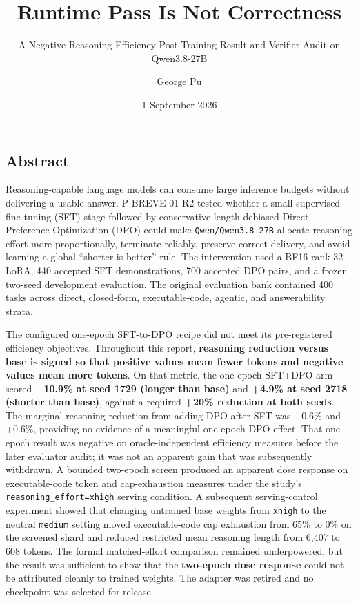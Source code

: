 \documentclass[
  9pt,
  letterpaper,
]{article}
\title{Runtime Pass Is Not Correctness}
\subtitle{A Negative Reasoning-Efficiency Post-Training Result and
Verifier Audit on Qwen3.8-27B}
\author{George Pu}
\date{1 September 2026}
\begin{document}
\maketitle

{
\hypersetup{linkcolor=}
\setcounter{tocdepth}{3}
\tableofcontents
}
\hypertarget{abstract}{%
\subsection{Abstract}\label{abstract}}

Reasoning-capable language models can consume large inference budgets
without delivering a usable answer. P-BREVE-01-R2 tested whether a small
supervised fine-tuning (SFT) stage followed by conservative
length-debiased Direct Preference Optimization (DPO) could make
\texttt{Qwen/Qwen3.8-27B} allocate reasoning effort more proportionally,
terminate reliably, preserve correct delivery, and avoid learning a
global ``shorter is better'' rule. The intervention used a BF16 rank-32
LoRA, 440 accepted SFT demonstrations, 700 accepted DPO pairs, and a
frozen two-seed development evaluation. The original evaluation bank
contained 400 tasks across direct, closed-form, executable-code,
agentic, and answerability strata.

The configured one-epoch SFT-to-DPO recipe did not meet its
pre-registered efficiency objectives. Throughout this report,
\textbf{reasoning reduction versus base is signed so that positive
values mean fewer tokens and negative values mean more tokens}. On that
metric, the one-epoch SFT+DPO arm scored \textbf{−10.9\% at seed 1729
(longer than base)} and \textbf{+4.9\% at seed 2718 (shorter than
base)}, against a required \textbf{+20\% reduction at both seeds}. The
marginal reasoning reduction from adding DPO after SFT was −0.6\% and
+0.6\%, providing no evidence of a meaningful one-epoch DPO effect. That
one-epoch result was negative on oracle-independent efficiency measures
before the later evaluator audit; it was not an apparent gain that was
subsequently withdrawn. A bounded two-epoch screen produced an apparent
dose response on executable-code token and cap-exhaustion measures under
the study's \texttt{reasoning\_effort=xhigh} serving condition. A
subsequent serving-control experiment showed that changing untrained
base weights from \texttt{xhigh} to the neutral \texttt{medium} setting
moved executable-code cap exhaustion from 65\% to 0\% on the screened
shard and reduced restricted mean reasoning length from 6,407 to 608
tokens. The formal matched-effort comparison remained underpowered, but
the result was sufficient to show that the \textbf{two-epoch dose
response} could not be attributed cleanly to trained weights. The
adapter was retired and no checkpoint was selected for release.
\end{document}

